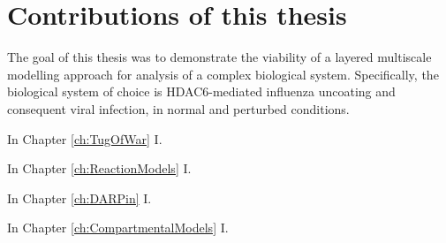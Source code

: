 \section{Contributions of this thesis}

The goal of this thesis was to demonstrate the viability of a layered multiscale modelling approach for analysis of a complex biological system. Specifically, the biological system of choice is HDAC6-mediated influenza uncoating and consequent viral infection, in normal and perturbed conditions.

In Chapter \ref{ch:TugOfWar} I.

In Chapter \ref{ch:ReactionModels} I.

In Chapter \ref{ch:DARPin} I.

In Chapter \ref{ch:CompartmentalModels} I.